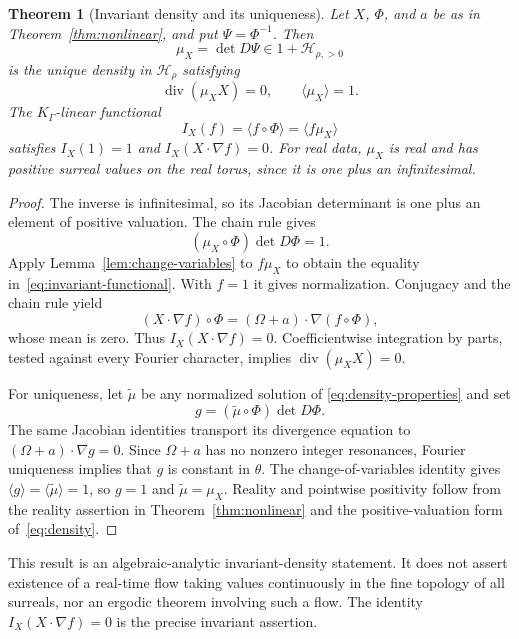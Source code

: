\documentclass[11pt,letterpaper]{article}
\newtheorem{theorem}{Theorem}[section]
\theoremstyle{definition}
\theoremstyle{remark}
\newcommand{\HH}{\mathcal H}
\newcommand{\diver}{\operatorname{div}}
\newcommand{\mean}[1]{\langle #1\rangle}
\numberwithin{equation}{section}
\begin{document}
\begin{theorem}[Invariant density and its uniqueness]\label{thm:density}
Let $X$, $\Phi$, and $a$ be as in Theorem~\ref{thm:nonlinear}, and put
$\Psi=\Phi^{-1}$.  Then
\begin{equation}\label{eq:density}
 \mu_X=\det D\Psi\in 1+\HH_{\rho,>0}
\end{equation}
is the unique density in $\HH_\rho$ satisfying
\begin{equation}\label{eq:density-properties}
 \diver(\mu_X X)=0,\qquad \mean{\mu_X}=1.
\end{equation}
The $K_\Gamma$-linear functional
\begin{equation}\label{eq:invariant-functional}
 I_X(f)=\mean{f\circ\Phi}=\mean{f\mu_X}
\end{equation}
satisfies $I_X(1)=1$ and $I_X(X\cdot\nabla f)=0$.
For real data, $\mu_X$ is real and has positive surreal values on the real
torus, since it is one plus an infinitesimal.
\end{theorem}
\begin{proof}
The inverse is infinitesimal, so its Jacobian determinant is one plus an
element of positive valuation.  The chain rule gives
\[
 (\mu_X\circ\Phi)\det D\Phi=1.
\]
Apply Lemma~\ref{lem:change-variables} to $f\mu_X$ to obtain the equality
in~\eqref{eq:invariant-functional}.  With $f=1$ it gives normalization.
Conjugacy and the chain rule yield
\[
 (X\cdot\nabla f)\circ\Phi
       =(\Omega+a)\cdot\nabla(f\circ\Phi),
\]
whose mean is zero.  Thus $I_X(X\cdot\nabla f)=0$.
Coefficientwise integration by parts, tested against every Fourier
character, implies $\diver(\mu_X X)=0$.

For uniqueness, let $\widetilde\mu$ be any normalized solution of
\eqref{eq:density-properties} and set
\[
 g=(\widetilde\mu\circ\Phi)\det D\Phi.
\]
The same Jacobian identities transport its divergence equation to
$(\Omega+a)\cdot\nabla g=0$.  Since $\Omega+a$ has no nonzero integer
resonances, Fourier uniqueness implies that $g$ is constant in $\theta$.
The change-of-variables identity gives
$\mean g=\mean{\widetilde\mu}=1$, so $g=1$ and
$\widetilde\mu=\mu_X$.  Reality and pointwise positivity follow from the
reality assertion in Theorem~\ref{thm:nonlinear} and the positive-valuation
form of~\eqref{eq:density}.
\end{proof}

This result is an algebraic-analytic invariant-density statement.  It does
not assert existence of a real-time flow taking values continuously in the
fine topology of all surreals, nor an ergodic theorem involving such a flow.
The identity $I_X(X\cdot\nabla f)=0$ is the precise invariant assertion.
\end{document}
